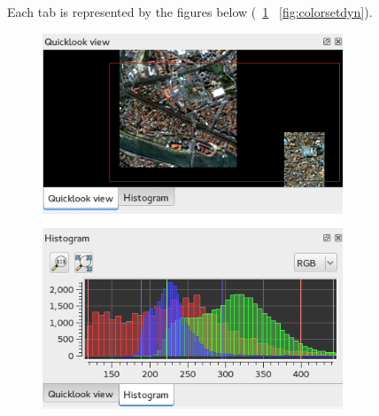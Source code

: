 Each tab is represented by the figures below (~\ref{fig:quickhisto} ~\ref{fig:colorsetdyn}).

\begin{figure}[!h] 
  \center
  \includegraphics[width=0.8\textwidth]{../Art/MonteverdiImages/quickhisto.png}
  \label{fig:quickhisto}
\end{figure}

